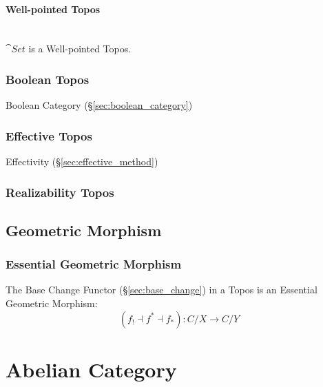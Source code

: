 \paragraph{Well-pointed Topos}\label{sec:wellpointed_topos}
\hfill \\

$\cat{Set}$ is a Well-pointed Topos.



\subsubsection{Boolean Topos}\label{sec:boolean_topos}

Boolean Category (\S\ref{sec:boolean_category})



\subsubsection{Effective Topos}\label{sec:effective_topos}

Effectivity (\S\ref{sec:effective_method})



\subsubsection{Realizability Topos}\label{sec:realizability_topos}



\subsection{Geometric Morphism}\label{sec:geometric_morphism}

\subsubsection{Essential Geometric Morphism}
\label{sec:essential_geometric}

The Base Change Functor (\S\ref{sec:base_change}) in a Topos is an
Essential Geometric Morphism:
\[
  (f_! \dashv f^* \dashv f_*):C/X \rightarrow C/Y
\]



\section{Abelian Category}\label{sec:abelian_category}

